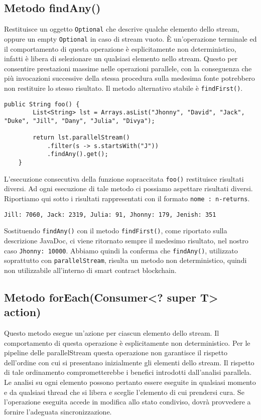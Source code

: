 		\subsection{Metodo findAny()}
			Restituisce un oggetto \lstinline|Optional| che descrive qualche elemento dello stream, oppure un empty \lstinline|Optional| in caso di stream vuoto. \`E un'operazione terminale ed il comportamento di questa operazione è esplicitamente non deterministico, infatti è libera di selezionare un qualsiasi elemento nello stream. Questo per consentire prestazioni massime nelle operazioni parallele, con la conseguenza che più invocazioni successive della stessa procedura sulla medesima fonte potrebbero non restituire lo stesso risultato. Il metodo alternativo stabile è \lstinline|findFirst()|.
			\begin{lstlisting}[breaklines=true]
	public String foo() {
		List<String> lst = Arrays.asList("Jhonny", "David", "Jack", "Duke", "Jill", "Dany", "Julia", "Divya");
		
		return lst.parallelStream()
			.filter(s -> s.startsWith("J"))
			.findAny().get();
	}
			\end{lstlisting}
			L'esecuzione consecutiva della funzione sopraccitata \lstinline|foo()| restituisce risultati diversi. Ad ogni esecuzione di tale metodo ci possiamo aspettare risultati diversi. Riportiamo qui sotto i risultati rappresentati con il formato \lstinline|nome : n-returns|.
			\begin{lstlisting}[numbers=none,frame=none]
	Jill: 7060, Jack: 2319, Julia: 91, Jhonny: 179, Jenish: 351
			\end{lstlisting}
			Sostituendo \lstinline|findAny()| con il metodo \lstinline|findFirst()|, come riportato sulla descrizione JavaDoc, ci viene ritornato sempre il medesimo risultato, nel nostro caso \lstinline|Jhonny: 10000|.
			Abbiamo quindi la conferma che \lstinline|findAny()|, utilizzato soprattutto con \lstinline|parallelStream|, risulta un metodo non deterministico, quindi non utilizzabile all'interno di smart contract blockchain.
			
		\subsection{Metodo forEach(Consumer<? super T> action)}
		\label{subsection-forEach}
			Questo metodo esegue un'azione per ciascun elemento dello stream. Il comportamento di questa operazione è esplicitamente non deterministico.
			Per le pipeline delle parallelStream  questa operazione non garantisce il rispetto dell'ordine con cui si presentano inizialmente gli elementi dello stream. Il rispetto di tale ordinamento comprometterebbe i benefici introdotti dall'analisi parallela. Le analisi su ogni elemento possono pertanto essere eseguite in qualsiasi momento e da qualsiasi thread che si libera e sceglie l'elemento di cui prendersi cura. Se l'operazione eseguita accede in modifica allo stato condiviso, dovrà provvedere a fornire l'adeguata sincronizzazione. 
			
